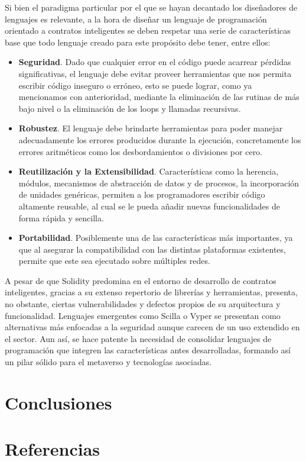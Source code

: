 \documentclass[a4paper,10pt]{article}
\begin{document}
	Si bien el paradigma particular por el que se hayan decantado los diseñadores de lenguajes es relevante, a la hora de diseñar un lenguaje de programación orientado a contratos inteligentes se deben respetar una serie de características base que todo lenguaje creado para este propósito debe tener, entre ellos:
	\begin{itemize}
		\item \textbf{Seguridad}. Dado que cualquier error en el código puede acarrear pérdidas significativas, el lenguaje debe evitar proveer herramientas que nos permita escribir código inseguro o erróneo, esto se puede lograr, como ya mencionamos con anterioridad, mediante la eliminación de las rutinas de más bajo nivel o la eliminación de los loops y llamadas recursivas.
		\item \textbf{Robustez}. El lenguaje debe brindarte herramientas para poder manejar adecuadamente los errores producidos durante la ejecución, concretamente los errores aritméticos como los desbordamientos o divisiones por cero.
		\item \textbf{Reutilización y la Extensibilidad}. Características como la herencia, módulos, mecanismos de abstracción de datos y de procesos, la incorporación de unidades genéricas, permiten a los programadores escribir código altamente reusable, al cual se le pueda añadir nuevas funcionalidades de forma rápida y sencilla.
		\item \textbf{Portabilidad}. Posiblemente una de las características más importantes, ya que al asegurar la compatibilidad con las distintas plataformas existentes, permite que este sea ejecutado sobre múltiples redes.
	\end{itemize}
	A pesar de que Solidity predomina en el entorno de desarrollo de contratos inteligentes, gracias a su extenso repertorio de librerías y herramientas, presenta, no obstante, ciertas vulnerabilidades y defectos propios de su arquitectura y funcionalidad. Lenguajes emergentes como Scilla o Vyper se presentan como alternativas más enfocadas a la seguridad aunque carecen de un uso extendido en el sector. Aun así, se hace patente la necesidad de consolidar lenguajes de programación que integren las características antes desarrolladas, formando así un pilar sólido para el metaverso y tecnologías asociadas.
	
	\section{Conclusiones}
	\section{Referencias}
	\nocite{*}
	\printbibliography[heading=none]
\end{document}
